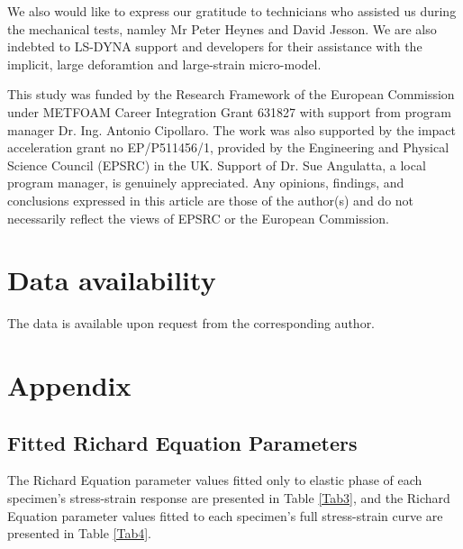 \documentclass[review]{elsarticle}
\begin{document}
We also would like to express our gratitude to technicians who assisted us during the mechanical tests, namley Mr Peter Heynes and David Jesson. We are also indebted to LS-DYNA support and developers for their assistance with the implicit, large deforamtion and large-strain micro-model.

This study was funded by the Research Framework of the European Commission under METFOAM Career Integration Grant 631827 with support from program manager Dr. Ing. Antonio Cipollaro. The work was also supported by the impact acceleration grant no EP/P511456/1, provided by the Engineering and Physical Science Council (EPSRC) in the UK. Support of Dr. Sue Angulatta, a local program manager, is genuinely appreciated. Any opinions, findings, and conclusions expressed in this article are those of the author(s) and do not necessarily reflect the views of EPSRC or the European Commission.


\section*{Data availability}

The data is available upon request from the corresponding author.



\section*{Appendix}

\subsection*{Fitted Richard Equation Parameters}

The Richard Equation parameter values fitted only to elastic phase of each specimen's stress-strain response are presented in Table \ref{Tab3}, and the Richard Equation parameter values fitted to each specimen's full stress-strain curve are presented in Table \ref{Tab4}.
\end{document}
